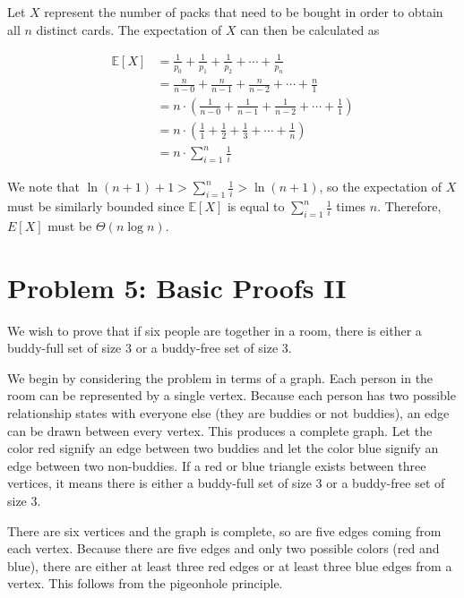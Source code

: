 \documentclass[12pt]{article}%
\begin{document}
Let $X$ represent the number of packs that need to be bought in order to obtain all $n$ distinct cards. The expectation of $X$ can then be calculated as

\begin{equation}
\begin{split}
\mathbb{E}[X] &= \frac{1}{p_0} + \frac{1}{p_1} + \frac{1}{p_2} + \cdots + \frac{1}{p_n} \\
&= \frac{n}{n - 0} +  \frac{n}{n - 1} +  \frac{n}{n - 2} + \cdots +  \frac{n}{1} \\
&= n \cdot (\frac{1}{n - 0} +  \frac{1}{n - 1} +  \frac{1}{n - 2} + \cdots +  \frac{1}{1}) \\
&= n \cdot (\frac{1}{1} +  \frac{1}{2} +  \frac{1}{3} + \cdots +  \frac{1}{n}) \\
&= n \cdot \sum_{i = 1}^{n} \frac{1}{i}
\end{split}
\end{equation}

We note that $\ln (n + 1) + 1 > \sum_{i = 1}^{n} \frac{1}{i} > \ln (n + 1)$, so the expectation of $X$ must be similarly bounded since $\mathbb{E}[X]$ is equal to $\sum_{i = 1}^{n} \frac{1}{i}$ times $n$. Therefore, $E[X]$ must be $\Theta(n \log n)$.

\section*{Problem 5: Basic Proofs II}
We wish to prove that if six people are together in a room, there is either a buddy-full set of size 3 or a buddy-free set of size 3.

We begin by considering the problem in terms of a graph. Each person in the room can be represented by a single vertex. Because each person has two possible relationship states with everyone else (they are buddies or not buddies), an edge can be drawn between every vertex. This produces a complete graph. Let the color red signify an edge between two buddies and let the color blue signify an edge between two non-buddies. If a red or blue triangle exists between three vertices, it means there is either a buddy-full set of size 3 or a buddy-free set of size 3.

There are six vertices and the graph is complete, so are five edges coming from each vertex. Because there are five edges and only two possible colors (red and blue), there are either at least three red edges or at least three blue edges from a vertex. This follows from the pigeonhole principle. 
\end{document}
